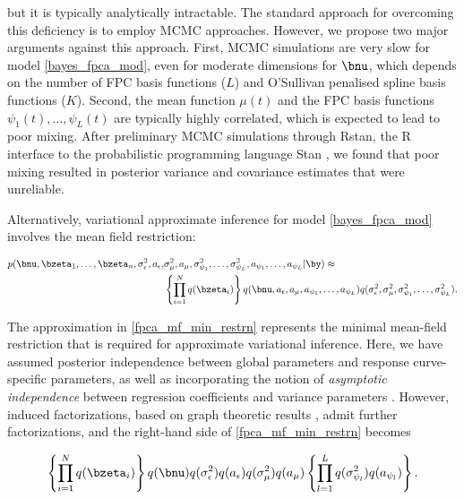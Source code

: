 \documentclass[12pt]{article}
\def\sigsqeps{\sigma^2_{\epsilon}}
\def\aeps{a_{\epsilon}}
\def\sigsqmu{\sigma^2_{\mu}}
\def\amu{a_{\mu}}
\newcommand\sigsqpsi[1]{\sigma^2_{\psi_{#1}}}
\newcommand\apsi[1]{a_{\psi_{#1}}}
\theoremstyle{plain}
\theoremstyle{definition}
\theoremstyle{remark}
\begin{document}
\noindent but it is typically analytically intractable. The standard approach for overcoming this deficiency is to
employ MCMC approaches. However, we propose two major arguments against this approach. First, MCMC
simulations are very slow for model \eqref{bayes_fpca_mod}, even for moderate dimensions for $\bnu$, which
depends on the number of FPC basis functions ($L$) and O'Sullivan penalised spline basis functions ($K$).
Second, the mean function $\mu (t)$ and the FPC basis functions $\psi_1 (t), \dots,
\psi_L (t)$ are typically highly correlated, which is expected to lead to poor mixing. After preliminary MCMC
simulations through \textsf{Rstan}, the \textsf{R} \cite{r20} interface to the probabilistic programming language
\textsf{Stan} \cite{rstan20}, we found that poor mixing resulted in posterior variance and covariance estimates
that were unreliable.

Alternatively, variational approximate inference for model \eqref{bayes_fpca_mod} involves
the mean field restriction:

\begin{align}
\begin{split}
	p (
		\bnu, \bzeta_1, \dots, \bzeta_n, \sigsqeps, \aeps, &\sigsqmu, \amu,
		\sigsqpsi{1}, \dots, \sigsqpsi{L}, \apsi{1}, \dots, \apsi{L} | \by
	) \approx \\
		&\left\{ \prod_{i=1}^N q (\bzeta_i) \right\} q (\bnu, \aeps, \amu, \apsi{1}, \dots, \apsi{L})
		q(\sigsqeps, \sigsqmu, \sigsqpsi{1}, \dots, \sigsqpsi{L}).
\end{split}
\label{fpca_mf_min_restrn}
\end{align}

\noindent The approximation in \eqref{fpca_mf_min_restrn} represents the minimal mean-field restriction that is
required for approximate variational inference. Here, we have assumed posterior independence between
global parameters and response curve-specific parameters, as well as incorporating the notion of
\emph{asymptotic independence} between regression coefficients and variance parameters
\cite[Section~3.1]{menictas13}.
However, induced factorizations, based on graph theoretic
results \cite[Section~10.2.5]{bishop06}, admit further factorizations, and the right-hand side of
\eqref{fpca_mf_min_restrn} becomes

\begin{equation}
	\left\{ \prod_{i=1}^N q (\bzeta_i) \right\} q (\bnu) q(\sigsqeps) q(\aeps)
	q(\sigsqmu) q (\amu) \left\{ \prod_{l=1}^L q(\sigsqpsi{l}) q(\apsi{l}) \right\}.
\label{fpca_mf_restrn}
\end{equation}
\end{document}
